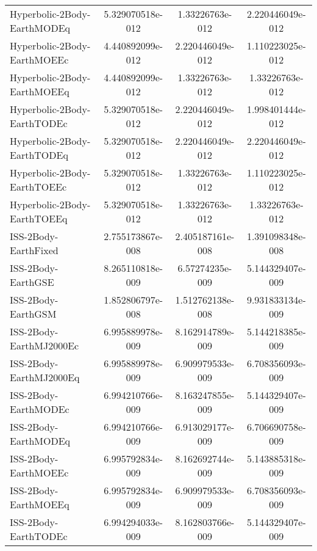 \begin{table}[htbp!]
\begin{tabular}{lccc}
         Hyperbolic-2Body-EarthMODEq & 5.329070518e-012 & 1.33226763e-012 & 2.220446049e-012 \\
         Hyperbolic-2Body-EarthMOEEc & 4.440892099e-012 & 2.220446049e-012 & 1.110223025e-012 \\
         Hyperbolic-2Body-EarthMOEEq & 4.440892099e-012 & 1.33226763e-012 & 1.33226763e-012 \\
         Hyperbolic-2Body-EarthTODEc & 5.329070518e-012 & 2.220446049e-012 & 1.998401444e-012 \\
         Hyperbolic-2Body-EarthTODEq & 5.329070518e-012 & 2.220446049e-012 & 2.220446049e-012 \\
         Hyperbolic-2Body-EarthTOEEc & 5.329070518e-012 & 1.33226763e-012 & 1.110223025e-012 \\
         Hyperbolic-2Body-EarthTOEEq & 5.329070518e-012 & 1.33226763e-012 & 1.33226763e-012 \\
         ISS-2Body-EarthFixed & 2.755173867e-008 & 2.405187161e-008 & 1.391098348e-008 \\
         ISS-2Body-EarthGSE & 8.265110818e-009 & 6.57274235e-009 & 5.144329407e-009 \\
         ISS-2Body-EarthGSM & 1.852806797e-008 & 1.512762138e-008 & 9.931833134e-009 \\
         ISS-2Body-EarthMJ2000Ec & 6.995889978e-009 & 8.162914789e-009 & 5.144218385e-009 \\
         ISS-2Body-EarthMJ2000Eq & 6.995889978e-009 & 6.909979533e-009 & 6.708356093e-009 \\
         ISS-2Body-EarthMODEc & 6.994210766e-009 & 8.163247855e-009 & 5.144329407e-009 \\
         ISS-2Body-EarthMODEq & 6.994210766e-009 & 6.913029177e-009 & 6.706690758e-009 \\
         ISS-2Body-EarthMOEEc & 6.995792834e-009 & 8.162692744e-009 & 5.143885318e-009 \\
         ISS-2Body-EarthMOEEq & 6.995792834e-009 & 6.909979533e-009 & 6.708356093e-009 \\
         ISS-2Body-EarthTODEc & 6.994294033e-009 & 8.162803766e-009 & 5.144329407e-009 \\

\end{tabular}
\end{table}
